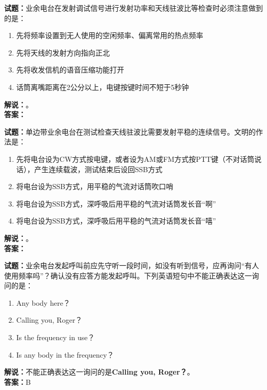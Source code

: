 \documentclass{ctexbook}
\begin{document}
\bigskip




\noindent\textbf{试题：}业余电台在发射调试信号进行发射功率和天线驻波比等检查时必须注意做到的是：
\begin{enumerate}[leftmargin=3em]
\item 先将频率设置到无人使用的空闲频率、偏离常用的热点频率
\item 先将天线的发射方向指向正北
\item 先将收发信机的语音压缩功能打开
\item 话筒离嘴距离在2公分以上，电键按键时间不短于5秒钟
\end{enumerate}
\noindent\textbf{解说：}\textbf{}。\\\noindent\textbf{答案：}

\bigskip




\noindent\textbf{试题：}单边带业余电台在测试检查天线驻波比需要发射平稳的连续信号。文明的作法是：
\begin{enumerate}[leftmargin=3em]
\item 先将电台设为CW方式按电键，或者设为AM或FM方式按PTT键（不对话筒说话），产生连续载波，测试结束后设回SSB方式
\item 将电台设为SSB方式，用平稳的气流对话筒吹口哨
\item 将电台设为SSB方式，深呼吸后用平稳的气流对话筒发长音“啊”
\item 将电台设为SSB方式，深呼吸后用平稳的气流对话筒发长音“嘻”
\end{enumerate}
\noindent\textbf{解说：}\textbf{}。\\\noindent\textbf{答案：}

\bigskip




\noindent\textbf{试题：}业余电台发起呼叫前应先守听一段时间，如没有听到信号，应再询问“有人使用频率吗”？确认没有应答方能发起呼叫。下列英语短句中不能正确表达这一询问的是：
\begin{enumerate}[leftmargin=3em]
\item Any body here？
\item Calling you, Roger？
\item Is the frequency in use？
\item Is any body in the frequency？
\end{enumerate}
\noindent\textbf{解说：}不能正确表达这一询问的是\textbf{Calling you, Roger？}。\\\noindent\textbf{答案：}B

\bigskip
\end{document}

